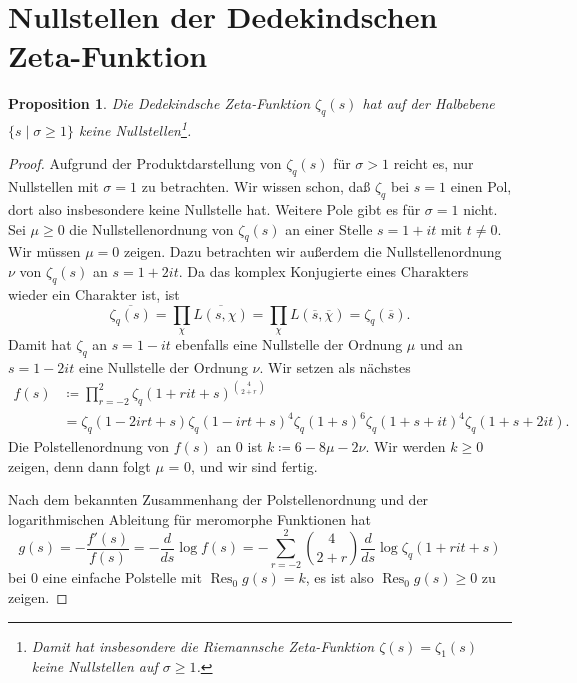 \documentclass[a4paper,twoside,openright]{report}
\newtheorem{prop}[thm]{Proposition}
\theoremstyle{definition}
\theoremstyle{remark}
\DeclareMathOperator{\Res}{Res}
\begin{document}
\section{Nullstellen der Dedekindschen Zeta-Funk\-tion}

\begin{prop}
  Die Dedekindsche Zeta-Funktion $\zeta_q(s)$ hat auf der Halbebene $\{s \mid \sigma \ge 1\}$
  keine Nullstellen\footnote{Damit hat insbesondere die Riemannsche Zeta-Funktion
  $\zeta(s) = \zeta_1(s)$ keine Nullstellen auf $\sigma \ge 1$.}. 
\end{prop}

\begin{proof}
  Aufgrund der Produktdarstellung von $\zeta_q(s)$ für $\sigma > 1$ reicht es, nur
  Nullstellen mit $\sigma = 1$ zu betrachten. Wir wissen schon, daß $\zeta_q$ bei $s = 1$
  einen Pol, dort also insbesondere keine Nullstelle hat. Weitere Pole gibt es für $\sigma = 1$ nicht.
  Sei $\mu \ge 0$ die Nullstellenordnung von $\zeta_q(s)$ an einer Stelle $s = 1 + i t$ mit $t \neq 0$.
  Wir müssen $\mu = 0$ zeigen. Dazu betrachten wir außerdem die Nullstellenordnung $\nu$
  von $\zeta_q(s)$ an $s = 1 + 2 i t$.
  Da das komplex Konjugierte eines Charakters wieder ein Charakter ist, ist
  \[
    \overline{\zeta_q(s)} = \prod_\chi \overline{L(s, \chi)} = \prod_\chi L(\overline s, \overline \chi)
    = \zeta_q(\overline s).
  \]
  Damit hat $\zeta_q$ an $s = 1 - i t$ ebenfalls eine Nullstelle der Ordnung $\mu$ und an
  $s = 1 - 2 i t$ eine Nullstelle der Ordnung $\nu$.
  Wir setzen als nächstes
  \[
    \begin{split}
      f(s) & \coloneqq \prod_{r = -2}^2 \zeta_q(1 + r i t + s)^{\binom{4}{2 + r}} \\
      & = \zeta_q(1 - 2 i r t + s) \zeta_q(1 - i r t + s)^4 \zeta_q(1 + s)^6 \zeta_q(1 + s + i t)^4 \zeta_q(1 + s + 2 i t).
    \end{split}
  \]
  Die Polstellenordnung von $f(s)$ an $0$ ist $k \coloneqq 6 - 8 \mu - 2 \nu$. Wir werden
  $k \ge 0$ zeigen, denn dann folgt $\mu$ = 0, und wir sind fertig.
  
  Nach dem bekannten Zusammenhang der Polstellenordnung und der logarithmischen
  Ableitung für meromorphe Funktionen hat
  \[
    g(s) = - \frac{f'(s)}{f(s)} = - \frac{d}{ds} \log f(s) =
    - \sum_{r = -2}^2 \binom{4}{2 + r} \frac d{ds} \log \zeta_q(1 + r it + s)
  \]
  bei $0$ eine einfache Polstelle mit $\Res_0 g(s) = k$, es ist also $\Res_0 g(s) \ge 0$ zu zeigen.
  

\end{proof}
\end{document}
